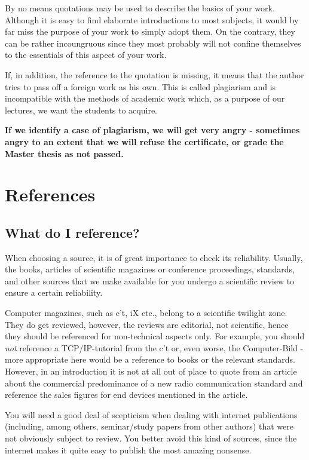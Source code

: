 By no means quotations may be used to describe the basics of your work. Although
it is easy to find elaborate introductions to most subjects, it would by far miss
the purpose of your work to simply adopt them. On the contrary, they can be rather
incoungruous since they most probably will not confine themselves to the essentials
of this aspect of your work.

If, in addition, the reference to the quotation is missing, it means that the author
tries to pass off a foreign work as his own. This is called plagiarism and is
incompatible with the methods of academic work which, as a purpose of our lectures,
we want the students to acquire.

\textbf{If we identify a case of plagiarism, we will get very angry -
   sometimes angry to an extent that we will refuse the certificate, or grade the
   Master thesis as not passed.}


\section{References}
\label{sec:references}

\subsection{What do I reference?}

When choosing a source, it is of great importance to check its reliability.
Usually, the  books, articles of scientific magazines or conference proceedings,
standards, and other sources that we make available for you undergo a scientific
review to ensure a certain reliability.

Computer magazines, such as c't, iX etc., belong to a scientific twilight
zone. They do get reviewed, however, the reviews are editorial, not
scientific, hence they should be referenced for non-technical aspects only.
For example, you should \emph{not} reference a TCP/IP-tutorial from the c't or,
even worse, the Computer-Bild - more appropriate here would be a reference to books
or the relevant standards. However, in an introduction it is not at all out of
place to quote from an article about the commercial predominance of a new radio
communication standard and reference the sales figures for end devices mentioned
in the article.

You will need a good deal of scepticism when dealing with internet publications
(including, among others, seminar/study papers from other authors) that were not
obviously subject to review. You better avoid this kind of sources, since the
internet makes it quite easy to publish the most amazing nonsense. 


